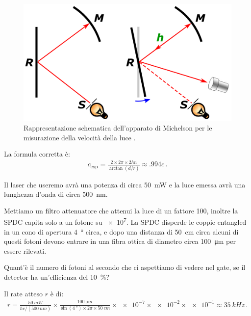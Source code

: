 \documentclass[a4paper,12pt]{article}
\begin{document}
\begin{figure}[ht]
\centering
\includegraphics[width=\textwidth]{Speed_of_light_calculation_using_Foucault's_rotating_mirror.png}
\caption{Rappresentazione schematica dell'apparato di Michelson per le misurazione della velocità della luce \cite[]{aurantiacaSpeedLightCalculation2015}.
}
\label{fig:michelson-apparatus}
\end{figure}

La formula corretta è: 
%
\begin{align}
c _{\text{exp}} = \frac{2 \times 2 \pi \times 2 h n}{\arctan(d / r)} \approx \num{.994} c
\,.
\end{align}

\begin{exo}
Il laser che useremo avrà una potenza di circa \SI{50}{mW} e la luce emessa avrà una lunghezza d'onda di circa \SI{500}{nm}. 

Mettiamo un filtro attenuatore che attenui la luce di un fattore 100, inoltre la SPDC capita solo a un fotone su \num{e7}.
La SPDC disperde le coppie entangled in un cono di apertura \SI{4}{\degree} circa, e dopo una distanza di \SI{50}{cm} circa alcuni di questi fotoni devono entrare in una fibra ottica di diametro circa \SI{100}{\micro m} per essere rilevati. 

Quant'è il numero di fotoni al secondo che ci aspettiamo di vedere nel gate, se il detector ha un'efficienza del \SI{10}{\percent}?
\end{exo}

Il rate atteso \(r\) è di:
%
\begin{align}
r = \frac{\SI{50}{mW}}{\hbar c / (\SI{500}{nm})}
\times 
\frac{\SI{100}{\micro m}}{\sin(\SI{4}{\degree}) \times 2 \pi  \times \SI{50}{cm}}
\times \num{e-7} \times \num{e-2} \times \num{e-1} \approx \SI{35}{kHz} 
\,.
\end{align}
%
\end{document}
